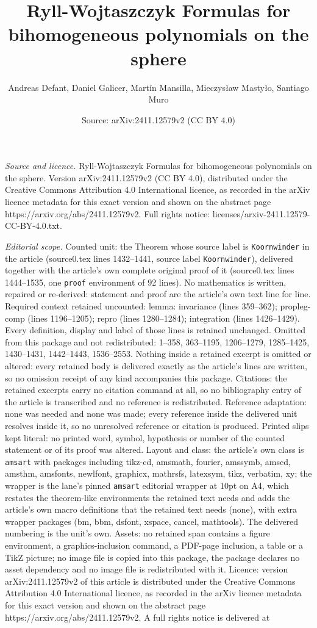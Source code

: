 \documentclass[10pt,a4paper]{amsart}
\title[Ryll-Wojtaszczyk Formulas for bihomogeneous polynomials on t]{Ryll-Wojtaszczyk Formulas for bihomogeneous polynomials on the sphere}
\author{Andreas Defant, Daniel Galicer, Mart\'in Mansilla, Mieczys{\l}aw Masty{\l}o, Santiago Muro}
\date{Source: arXiv:2411.12579v2 (CC BY 4.0)}
\begin{document}
\maketitle

\noindent\emph{Source and licence.} Ryll-Wojtaszczyk Formulas for bihomogeneous polynomials on the sphere. Version arXiv:2411.12579v2 (CC BY 4.0), distributed under the Creative Commons Attribution 4.0 International licence, as recorded in the arXiv licence metadata for this exact version and shown on the abstract page https://arxiv.org/abs/2411.12579v2. Full rights notice: licenses/arxiv-2411.12579-CC-BY-4.0.txt.\par\smallskip

\noindent\textit{Editorial scope.} Counted unit: the Theorem whose source label is \texttt{Koornwinder} in the article (source0.tex lines 1432--1441, source label \texttt{Koornwinder}), delivered together with the article's own complete original proof of it (source0.tex lines 1444--1535, one \texttt{proof} environment of 92 lines). No mathematics is written, repaired or re-derived: statement and proof are the article's own text line for line. Required context retained uncounted: lemma: invariance (lines 359--362); propleg-comp (lines 1196--1205); repro (lines 1280--1284); integration (lines 1426--1429). Every definition, display and label of those lines is retained unchanged. Omitted from this package and not redistributed: 1--358, 363--1195, 1206--1279, 1285--1425, 1430--1431, 1442--1443, 1536--2553. Nothing inside a retained excerpt is omitted or altered: every retained body is delivered exactly as the article's lines are written, so no omission receipt of any kind accompanies this package. Citations: the retained excerpts carry no citation command at all, so no bibliography entry of the article is transcribed and no reference is redistributed. Reference adaptation: none was needed and none was made; every reference inside the delivered unit resolves inside it, so no unresolved reference or citation is produced. Printed slips kept literal: no printed word, symbol, hypothesis or number of the counted statement or of its proof was altered. Layout and class: the article's own class is \texttt{amsart} with packages including tikz-cd, amsmath, fourier, amssymb, amscd, amsthm, amsfonts, newlfont, graphicx, mathrsfs, latexsym, tikz, verbatim, xy; the wrapper is the lane's pinned \texttt{amsart} editorial wrapper at 10pt on A4, which restates the theorem-like environments the retained text needs and adds the article's own macro definitions that the retained text needs (none), with extra wrapper packages (bm, bbm, dsfont, xspace, cancel, mathtools). The delivered numbering is the unit's own. Assets: no retained span contains a figure environment, a graphics-inclusion command, a PDF-page inclusion, a table or a TikZ picture; no image file is copied into this package, the package declares no asset dependency and no image file is redistributed with it. Licence: version arXiv:2411.12579v2 of this article is distributed under the Creative Commons Attribution 4.0 International licence, as recorded in the arXiv licence metadata for this exact version and shown on the abstract page https://arxiv.org/abs/2411.12579v2. A full rights notice is delivered at 
\end{document}
